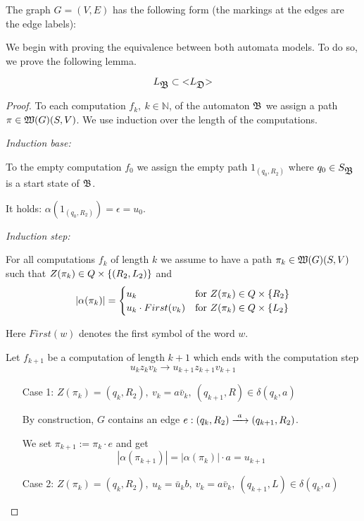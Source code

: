 The graph $G = (V, E)$ has the following form (the markings at the edges are
the edge labels):

\missingfigure

We begin with proving the equivalence between both automata models. To do so, we
prove the following lemma.

\begin{lemma}
\[ L_{\mbox{$\mathfrak{B}$}} \subset \mbox{${<}{L_{\mbox{$\mathfrak{D}$}}}{>}$} \]
\end{lemma}

\begin{proof}
To each computation $f_k,\ k \in \mathbb{N}$, of the automaton
$\mbox{$\mathfrak{B}$}$ we assign a path $\pi \in \mbox{$\mathfrak{W}({G})$}(S, V)$. We use induction over the
length of the computations.

{\em Induction base:}

To the empty computation $f_0$ we assign the empty path $1_{(q_0, R_2)}$ where
$q_0 \in S_{\mbox{$\mathfrak{B}$}}$ is a start state of $\mbox{$\mathfrak{B}$}$.

It holds: $\alpha(1_{(q_0, R_2)}) = \epsilon = u_0$.

{\em Induction step:}

For all computations $f_k$ of length $k$ we assume to have a path $\pi_k \in
\mbox{$\mathfrak{W}({G})$}(S, V)$ such that $Z(\pi_k) \in Q \times \mbox{$\{(R_2, L_2)\}$}$ and
\[ |\alpha(\pi_k)| = \begin{cases}
u_k & \text{for }Z(\pi_k) \in Q \times \mbox{$\{R_2\}$} \\
u_k \cdot First(v_k) & \text{for }Z(\pi_k) \in Q \times \mbox{$\{L_2\}$}
\end{cases} \]

Here $First(w)$ denotes the first symbol of the word $w$.

Let $f_{k+1}$ be a computation of length $k+1$ which ends with the computation
step
\[ u_k z_k v_k \to u_{k+1} z_{k+1} v_{k+1} \]

\begin{itemize}
  \item[Case 1:] $Z(\pi_k) = (q_k, R_2),\ v_k = a \bar{v}_k,\ (q_{k+1}, R) \in
  \delta(q_k, a)$
  
  By construction, $G$ contains an edge $e: (q_k, R_2) \xrightarrow{\ {a}\ } (q_{k+1}, R_2)$.
  
  We set $\pi_{k+1} := \pi_k \cdot e$ and get
  \[ |\alpha(\pi_{k+1})| = |\alpha(\pi_k)| \cdot a = u_{k+1} \]
  
  \item[Case 2:] $Z(\pi_k) = (q_k, R_2),\ u_k = \bar{u}_k b,\ v_k = a
  \bar{v}_k,\ (q_{k+1}, L) \in \delta(q_k, a)$
  

\end{itemize}
\end{proof}
